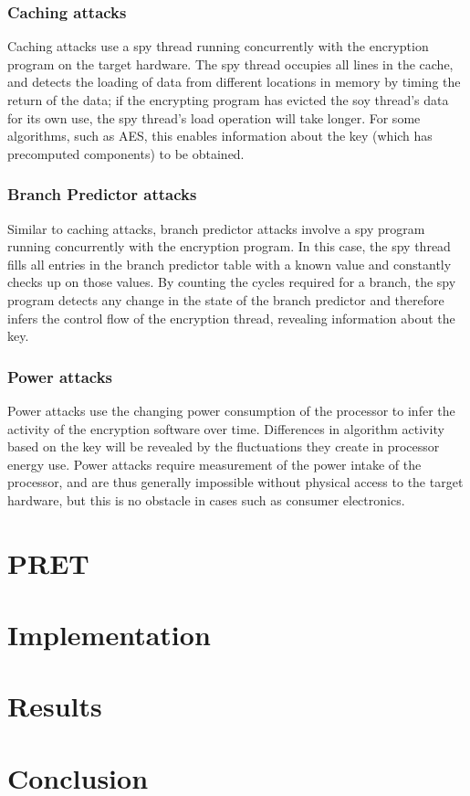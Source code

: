 \documentclass[times, 10pt,twocolumn]{article}
\begin{document}
\subsubsection{Caching attacks}
Caching attacks use a spy thread running concurrently with the encryption program on the target hardware.  The spy thread occupies all lines in the cache, and detects the loading of data from different locations in memory by timing the return of the data; if the encrypting program has evicted the soy thread's data for its own use, the spy thread's load operation will take longer.  For some algorithms, such as AES, this enables information about the key (which has precomputed components) to be obtained.
\subsubsection{Branch Predictor attacks}
Similar to caching attacks, branch predictor attacks involve a spy program running concurrently with the encryption program.  In this case, the spy thread fills all entries in the branch predictor table with a known value and constantly checks up on those values.  By counting the cycles required for a branch, the spy program detects any change in the state of the branch predictor and therefore infers the control flow of the encryption thread, revealing information about the key.
\subsubsection{Power attacks}
Power attacks use the changing power consumption of the processor to infer the activity of the encryption software over time.  Differences in algorithm activity based on the key will be revealed by the fluctuations they create in processor energy use.  Power attacks require measurement of the power intake of the processor, and are thus generally impossible without physical access to the target hardware, but this is no obstacle in cases such as consumer electronics.
\section{PRET}


\section{Implementation}

\section{Results}


\section{Conclusion}




\end{document}
